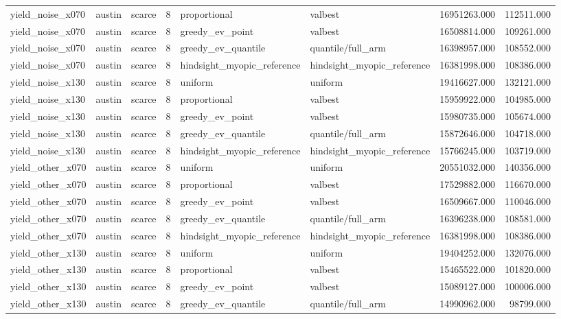 \begin{tabular}{lllrllrr}
yield\_noise\_x070 & austin & scarce & 8 & proportional & valbest & 16951263.000 & 112511.000 \\
yield\_noise\_x070 & austin & scarce & 8 & greedy\_ev\_point & valbest & 16508814.000 & 109261.000 \\
yield\_noise\_x070 & austin & scarce & 8 & greedy\_ev\_quantile & quantile/full\_arm & 16398957.000 & 108552.000 \\
yield\_noise\_x070 & austin & scarce & 8 & hindsight\_myopic\_reference & hindsight\_myopic\_reference & 16381998.000 & 108386.000 \\
yield\_noise\_x130 & austin & scarce & 8 & uniform & uniform & 19416627.000 & 132121.000 \\
yield\_noise\_x130 & austin & scarce & 8 & proportional & valbest & 15959922.000 & 104985.000 \\
yield\_noise\_x130 & austin & scarce & 8 & greedy\_ev\_point & valbest & 15980735.000 & 105674.000 \\
yield\_noise\_x130 & austin & scarce & 8 & greedy\_ev\_quantile & quantile/full\_arm & 15872646.000 & 104718.000 \\
yield\_noise\_x130 & austin & scarce & 8 & hindsight\_myopic\_reference & hindsight\_myopic\_reference & 15766245.000 & 103719.000 \\
yield\_other\_x070 & austin & scarce & 8 & uniform & uniform & 20551032.000 & 140356.000 \\
yield\_other\_x070 & austin & scarce & 8 & proportional & valbest & 17529882.000 & 116670.000 \\
yield\_other\_x070 & austin & scarce & 8 & greedy\_ev\_point & valbest & 16509667.000 & 110046.000 \\
yield\_other\_x070 & austin & scarce & 8 & greedy\_ev\_quantile & quantile/full\_arm & 16396238.000 & 108581.000 \\
yield\_other\_x070 & austin & scarce & 8 & hindsight\_myopic\_reference & hindsight\_myopic\_reference & 16381998.000 & 108386.000 \\
yield\_other\_x130 & austin & scarce & 8 & uniform & uniform & 19404252.000 & 132076.000 \\
yield\_other\_x130 & austin & scarce & 8 & proportional & valbest & 15465522.000 & 101820.000 \\
yield\_other\_x130 & austin & scarce & 8 & greedy\_ev\_point & valbest & 15089127.000 & 100006.000 \\
yield\_other\_x130 & austin & scarce & 8 & greedy\_ev\_quantile & quantile/full\_arm & 14990962.000 & 98799.000 \\

\end{tabular}
